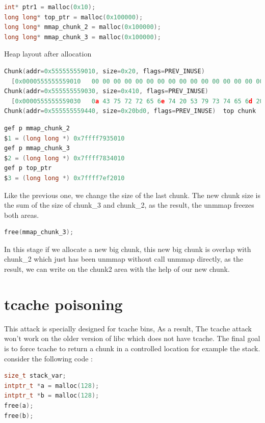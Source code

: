 \documentclass{masterthesis}
\newcommand*\tch{tcache}
\begin{document}
\begin{lstlisting}[language=c,frame=tlrb]
int* ptr1 = malloc(0x10);
long long* top_ptr = malloc(0x100000);
long long* mmap_chunk_2 = malloc(0x100000);
long long* mmap_chunk_3 = malloc(0x100000);
\end{lstlisting}

Heap layout after allocation 

\begin{lstlisting}[language=c,frame=tlrb]
Chunk(addr=0x555555559010, size=0x20, flags=PREV_INUSE)
  [0x0000555555559010   00 00 00 00 00 00 00 00 00 00 00 00 00 00 00 00  ................]
Chunk(addr=0x555555559030, size=0x410, flags=PREV_INUSE)
  [0x0000555555559030   0a 43 75 72 72 65 6e 74 20 53 79 73 74 65 6d 20  .Current System ]
Chunk(addr=0x555555559440, size=0x20bd0, flags=PREV_INUSE)  top chunk
\end{lstlisting}

\begin{lstlisting}[language=c,frame=tlrb]
gef p mmap_chunk_2
$1 = (long long *) 0x7ffff7935010
gef p mmap_chunk_3
$2 = (long long *) 0x7ffff7834010
gef p top_ptr
$3 = (long long *) 0x7ffff7ef2010
\end{lstlisting}

Like the previous one, we change the size of the last chunk. The new chunk size is the sum of the size of chunk\_3 and chunk\_2, as the result, the unmmap freezes both areas.

\begin{lstlisting}[language=c,frame=tlrb]
free(mmap_chunk_3);
\end{lstlisting}

In this stage if we allocate a new big chunk, this new big chunk is overlap with chunk\_2 which just has been unmmap without call unmmap directly, as the result, we can write on the chunk2 area with the help of our new chunk.

\section{\tch{} poisoning}
This attack is specially designed for \tch{} bins, As a result, The \tch{} attack won't work on the older version of libc which does not have \tch{}. The final goal is to force \tch{} to return a chunk in a controlled location for example the stack. consider the following code : 

\begin{lstlisting}[language=c,frame=tlrb]
size_t stack_var;
intptr_t *a = malloc(128);
intptr_t *b = malloc(128);
free(a);
free(b);
\end{lstlisting}
\end{document}

